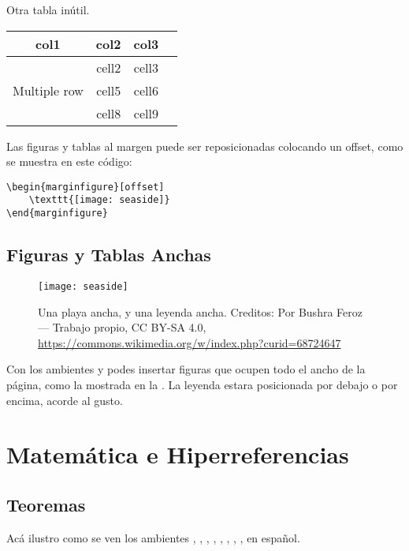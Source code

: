 \begin{margintable}
    \caption[Otra tabla inútil]{Otra tabla inútil.}
    \raggedright
    \begin{tabular}{ c c c c }
        \hline
        col1 & col2 & col3 \\
        \hline
        \multirow{3}{4em}{Multiple row} & cell2 & cell3 \\ & cell5 & cell6 
        \\ & cell8 & cell9 \\ \hline
    \end{tabular}
\end{margintable}

Las figuras y tablas al margen puede ser reposicionadas colocando un offset, como se muestra en este código:
    
\begin{lstlisting}
\begin{marginfigure}[offset]
    \texttt{[image: seaside]}
\end{marginfigure}
\end{lstlisting}

\subsection{Figuras y Tablas Anchas}

\begin{figure*}[h!]
	\texttt{[image: seaside]}
    \caption[Una playa ancha]{Una playa ancha, y una leyenda ancha. Creditos: Por Bushra Feroz --- Trabajo propio, CC BY-SA 4.0, \url{https://commons.wikimedia.org/w/index.php?curid=68724647}}
\end{figure*}

Con los ambientes  y  podes insertar figuras que ocupen todo el ancho de la página, como la mostrada en la . La leyenda estara posicionada por debajo o por encima, acorde al gusto.

\section{Matemática e Hiperreferencias}
\subsection{Teoremas}
Acá ilustro como se ven los ambientes , , , , , , , , en español.

